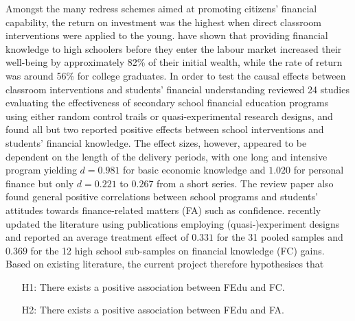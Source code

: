 Amongst the many redress schemes aimed at promoting citizens' financial capability, the return on investment was the highest when direct classroom interventions were applied to the young. \citet{lusardi:2014} have shown that providing financial knowledge to high schoolers before they enter the labour market increased their well-being by approximately 82\% of their initial wealth, while the rate of return was around 56\% for college graduates. In order to test the causal effects between classroom interventions and students' financial understanding \citet{amagir:2018} reviewed 24 studies evaluating the effectiveness of secondary school financial education programs using either random control trails or quasi-experimental research designs, and found all but two reported positive effects between school interventions and students' financial knowledge. The effect sizes, however, appeared to be dependent on the length of the delivery periods, with one long and intensive program yielding $d=0.981$ for basic economic knowledge and $1.020$ for personal finance but only $d=0.221$ to $0.267$ from a short series. The review paper also found general positive correlations between school programs and students' attitudes towards finance-related matters (FA) such as confidence. \citet{kaiser:2020} recently updated the literature using publications employing (quasi-)experiment designs and reported an average treatment effect of $0.331$ for the 31 pooled samples and $0.369$ for the 12 high school sub-samples on financial knowledge (FC) gains. Based on existing literature, the current project therefore hypothesises that
\begin{itemize}
    \item[H1:] There exists a positive association between FEdu and FC.
    \item[H2:] There exists a positive association between FEdu and FA.
\end{itemize}

